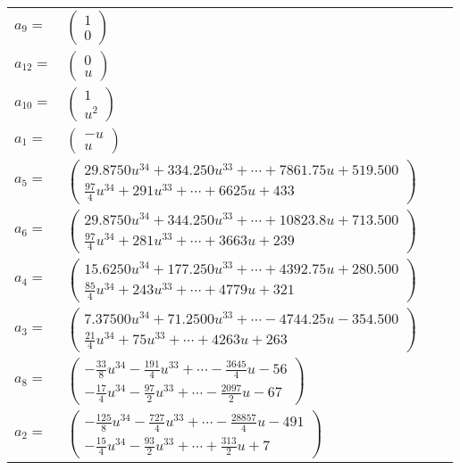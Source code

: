 \documentclass[1p]{elsarticle_modified}
\theoremstyle{definition}
\begin{document}
\begin{tabular}{m{7pt} m{180pt} m{7pt} m{180pt} }
\flushright $a_{9}=$&$\begin{pmatrix}1\\0\end{pmatrix}$ \\
\flushright $a_{12}=$&$\begin{pmatrix}0\\u\end{pmatrix}$ \\
\flushright $a_{10}=$&$\begin{pmatrix}1\\u^2\end{pmatrix}$ \\
\flushright $a_{1}=$&$\begin{pmatrix}- u\\u\end{pmatrix}$ \\
\flushright $a_{5}=$&$\begin{pmatrix}29.8750 u^{34}+334.250 u^{33}+\cdots+7861.75 u+519.500\\\frac{97}{4} u^{34}+291 u^{33}+\cdots+6625 u+433\end{pmatrix}$ \\
\flushright $a_{6}=$&$\begin{pmatrix}29.8750 u^{34}+344.250 u^{33}+\cdots+10823.8 u+713.500\\\frac{97}{4} u^{34}+281 u^{33}+\cdots+3663 u+239\end{pmatrix}$ \\
\flushright $a_{4}=$&$\begin{pmatrix}15.6250 u^{34}+177.250 u^{33}+\cdots+4392.75 u+280.500\\\frac{85}{4} u^{34}+243 u^{33}+\cdots+4779 u+321\end{pmatrix}$ \\
\flushright $a_{3}=$&$\begin{pmatrix}7.37500 u^{34}+71.2500 u^{33}+\cdots-4744.25 u-354.500\\\frac{21}{4} u^{34}+75 u^{33}+\cdots+4263 u+263\end{pmatrix}$ \\
\flushright $a_{8}=$&$\begin{pmatrix}-\frac{33}{8} u^{34}-\frac{191}{4} u^{33}+\cdots-\frac{3645}{4} u-56\\-\frac{17}{4} u^{34}-\frac{97}{2} u^{33}+\cdots-\frac{2097}{2} u-67\end{pmatrix}$ \\
\flushright $a_{2}=$&$\begin{pmatrix}-\frac{125}{8} u^{34}-\frac{727}{4} u^{33}+\cdots-\frac{28857}{4} u-491\\-\frac{15}{4} u^{34}-\frac{93}{2} u^{33}+\cdots+\frac{313}{2} u+7\end{pmatrix}$ \\

\end{tabular}
\end{document}
